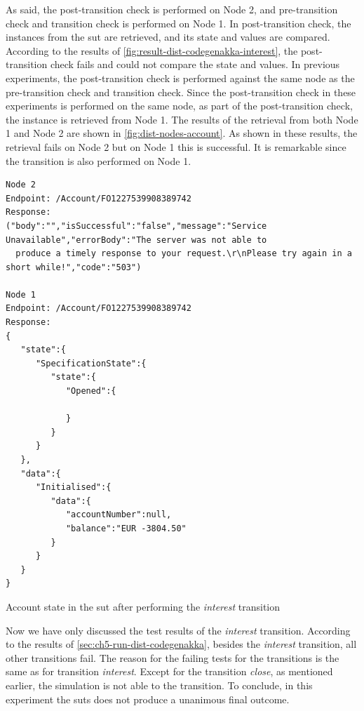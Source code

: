 As said, the post-transition check is performed on Node 2, and pre-transition
check and transition check is performed on Node 1. In post-transition check, the
instances from the \gls{sut} are retrieved, and its state and values are
compared. According to the results of
\autoref{fig:result-dist-codegenakka-interest}, the post-transition check fails
and could not compare the state and values. In previous experiments, the
post-transition check is performed against the same node as the pre-transition
check and transition check. Since the post-transition check in these experiments
is performed on the same node, as part of the post-transition check, the
instance is retrieved from Node 1. The results of the retrieval from both Node 1
and Node 2 are shown in \autoref{fig:dist-nodes-account}. As shown in these
results, the retrieval fails on Node 2 but on Node 1 this is successful. It is
remarkable since the transition is also performed on Node 1.

\begin{sourcecode}[h!]
\begin{lstlisting}[]
Node 2
Endpoint: /Account/FO1227539908389742
Response:
("body":"","isSuccessful":"false","message":"Service Unavailable","errorBody":"The server was not able to
  produce a timely response to your request.\r\nPlease try again in a short while!","code":"503")

Node 1
Endpoint: /Account/FO1227539908389742
Response:
{
   "state":{
      "SpecificationState":{
         "state":{
            "Opened":{

            }
         }
      }
   },
   "data":{
      "Initialised":{
         "data":{
            "accountNumber":null,
            "balance":"EUR -3804.50"
         }
      }
   }
}
\end{lstlisting}
\caption{Account state in the \gls{sut} after performing the \textit{interest} transition}\label{fig:dist-nodes-account}
\end{sourcecode}
\FloatBarrier

Now we have only discussed the test results of the \textit{interest} transition.
According to the results of \autoref{sec:ch5-run-dist-codegenakka}, besides the
\textit{interest} transition, all other transitions fail. The reason for the
failing tests for the transitions is the same as for transition
\textit{interest}. Except for the transition \textit{close}, as mentioned
earlier, the simulation is not able to the transition.
To conclude, in this experiment the \gls{sut}s does not produce a unanimous final outcome.

